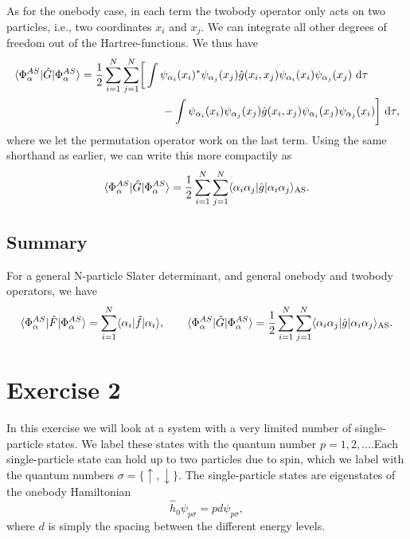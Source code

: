 \documentclass[a4paper, 11pt, notitlepage, english]{article}
\newcommand{\op}[1]{\hat{#1}}
\newcommand{\braopket}[3]{\langle #1 | {#2} | #3 \rangle}
\renewcommand{\d}{{\rm d}}
\begin{document}
As for the onebody case, in each term the twobody operator only acts on two particles, i.e., two coordinates $x_i$ and $x_j$. We can integrate all other degrees of freedom out of the Hartree-functions. We thus have
\begin{align*}
\braopket{\Phi^{AS}_{\alpha}}{\op{G}}{\Phi^{AS}_{\alpha}} 
= \frac{1}{2}\sum_{i=1}^N\sum_{j=1}^N &\bigg[\int \psi_{\alpha_i}(x_i)^*\psi_{\alpha_j}(x_j) \op{g}(x_i,x_j) \psi_{\alpha_i}(x_i)\psi_{\alpha_j}(x_j) \ \d \tau \\
&\qquad - \int \psi_{\alpha_i}(x_i)\psi_{\alpha_j}(x_j) \op{g}(x_i,x_j) \psi_{\alpha_i}(x_j)\psi_{\alpha_j}(x_i) \bigg] \ \d \tau,
\end{align*}
where we let the permutation operator work on the last term. Using the same shorthand as earlier, we can write this more compactily as
$$ \braopket{\Phi^{AS}_{\alpha}}{\op{G}}{\Phi^{AS}_{\alpha}} 
= \frac{1}{2}\sum_{i=1}^N\sum_{j=1}^N \braopket{\alpha_i\alpha_j}{\op{g}}{\alpha_i\alpha_j}_{\rm AS}.$$

\subsection*{Summary}

For a general N-particle Slater determinant, and general onebody and twobody operators, we have
\begin{align*}
\braopket{\Phi^{AS}_{\alpha}}{\op{F}}{\Phi^{AS}_{\alpha}} = \sum_{i=1}^N \braopket{\alpha_i}{\op{f}}{\alpha_i}, \qquad 
\braopket{\Phi^{AS}_{\alpha}}{\op{G}}{\Phi^{AS}_{\alpha}} 
= \frac{1}{2}\sum_{i=1}^N\sum_{j=1}^N \braopket{\alpha_i\alpha_j}{\op{g}}{\alpha_i\alpha_j}_{\rm AS}.
\end{align*}


\section*{Exercise 2}
In this exercise we will look at a system with a very limited number of single-particle states. We label these states with the quantum number $p=1,2,\ldots$.Each single-particle state can hold up to two particles due to spin, which we label with the quantum numbers $\sigma=\{\uparrow, \downarrow\}$. The single-particle states are eigenstates of the onebody Hamiltonian
$$\op{h}_0 \psi_{p\sigma} = pd\psi_{p\sigma},$$
where $d$ is simply the spacing between the different energy levels.
\end{document}

